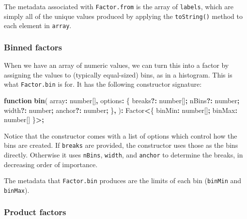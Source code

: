 \documentclass[
]{book}
\newenvironment{Shaded}{\begin{snugshade}}{\end{snugshade}}
\newcommand{\DataTypeTok}[1]{\textcolor[rgb]{0.13,0.29,0.53}{#1}}
\newcommand{\FunctionTok}[1]{\textcolor[rgb]{0.13,0.29,0.53}{\textbf{#1}}}
\newcommand{\KeywordTok}[1]{\textcolor[rgb]{0.13,0.29,0.53}{\textbf{#1}}}
\newcommand{\NormalTok}[1]{#1}
\newcommand{\OperatorTok}[1]{\textcolor[rgb]{0.81,0.36,0.00}{\textbf{#1}}}
\theoremstyle{definition}
\theoremstyle{definition}
\theoremstyle{definition}
\theoremstyle{definition}
\theoremstyle{remark}
\begin{document}
The metadata associated with \texttt{Factor.from} is the array of \texttt{labels}, which are simply all of the unique values produced by applying the \texttt{toString()} method to each element in \texttt{array}.

\subsubsection{Binned factors}\label{binned-factors}

When we have an array of numeric values, we can turn this into a factor by assigning the values to (typically equal-sized) bins, as in a histogram. This is what \texttt{Factor.bin} is for. It has the following constructor signature:

\begin{Shaded}
\begin{Highlighting}[]
\KeywordTok{function} \FunctionTok{bin}\NormalTok{(}
\NormalTok{  array}\OperatorTok{:} \DataTypeTok{number}\NormalTok{[]}\OperatorTok{,}
\NormalTok{  options}\OperatorTok{:}\NormalTok{ \{}
\NormalTok{    breaks}\OperatorTok{?:} \DataTypeTok{number}\NormalTok{[]}\OperatorTok{;}
\NormalTok{    nBins}\OperatorTok{?:} \DataTypeTok{number}\OperatorTok{;}
\NormalTok{    width}\OperatorTok{?:} \DataTypeTok{number}\OperatorTok{;}
\NormalTok{    anchor}\OperatorTok{?:} \DataTypeTok{number}\OperatorTok{;}
\NormalTok{  \}}\OperatorTok{,}
\NormalTok{)}\OperatorTok{:}\NormalTok{ Factor}\OperatorTok{\textless{}}\NormalTok{\{ binMin}\OperatorTok{:} \DataTypeTok{number}\NormalTok{[]}\OperatorTok{;}\NormalTok{ binMax}\OperatorTok{:} \DataTypeTok{number}\NormalTok{[] \}}\OperatorTok{\textgreater{};}
\end{Highlighting}
\end{Shaded}

Notice that the constructor comes with a list of options which control how the bins are created. If \texttt{breaks} are provided, the constructor uses those as the bins directly. Otherwise it uses \texttt{nBins}, \texttt{width}, and \texttt{anchor} to determine the breaks, in decreasing order of importance.

The metadata that \texttt{Factor.bin} produces are the limits of each bin (\texttt{binMin} and \texttt{binMax}).

\subsubsection{Product factors}\label{product-factors}
\end{document}
